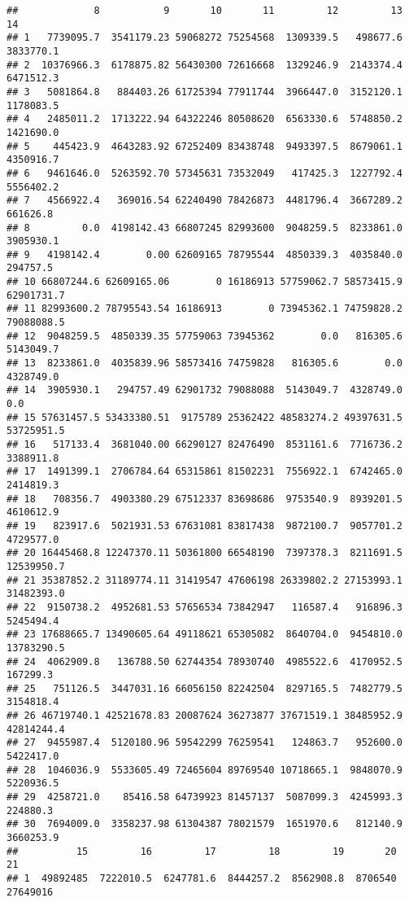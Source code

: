 \documentclass[
]{article}
\begin{document}
\begin{verbatim}
##             8           9       10       11         12         13         14
## 1   7739095.7  3541179.23 59068272 75254568  1309339.5   498677.6  3833770.1
## 2  10376966.3  6178875.82 56430300 72616668  1329246.9  2143374.4  6471512.3
## 3   5081864.8   884403.26 61725394 77911744  3966447.0  3152120.1  1178083.5
## 4   2485011.2  1713222.94 64322246 80508620  6563330.6  5748850.2  1421690.0
## 5    445423.9  4643283.92 67252409 83438748  9493397.5  8679061.1  4350916.7
## 6   9461646.0  5263592.70 57345631 73532049   417425.3  1227792.4  5556402.2
## 7   4566922.4   369016.54 62240490 78426873  4481796.4  3667289.2   661626.8
## 8         0.0  4198142.43 66807245 82993600  9048259.5  8233861.0  3905930.1
## 9   4198142.4        0.00 62609165 78795544  4850339.3  4035840.0   294757.5
## 10 66807244.6 62609165.06        0 16186913 57759062.7 58573415.9 62901731.7
## 11 82993600.2 78795543.54 16186913        0 73945362.1 74759828.2 79088088.5
## 12  9048259.5  4850339.35 57759063 73945362        0.0   816305.6  5143049.7
## 13  8233861.0  4035839.96 58573416 74759828   816305.6        0.0  4328749.0
## 14  3905930.1   294757.49 62901732 79088088  5143049.7  4328749.0        0.0
## 15 57631457.5 53433380.51  9175789 25362422 48583274.2 49397631.5 53725951.5
## 16   517133.4  3681040.00 66290127 82476490  8531161.6  7716736.2  3388911.8
## 17  1491399.1  2706784.64 65315861 81502231  7556922.1  6742465.0  2414819.3
## 18   708356.7  4903380.29 67512337 83698686  9753540.9  8939201.5  4610612.9
## 19   823917.6  5021931.53 67631081 83817438  9872100.7  9057701.2  4729577.0
## 20 16445468.8 12247370.11 50361800 66548190  7397378.3  8211691.5 12539950.7
## 21 35387852.2 31189774.11 31419547 47606198 26339802.2 27153993.1 31482393.0
## 22  9150738.2  4952681.53 57656534 73842947   116587.4   916896.3  5245494.4
## 23 17688665.7 13490605.64 49118621 65305082  8640704.0  9454810.0 13783290.5
## 24  4062909.8   136788.50 62744354 78930740  4985522.6  4170952.5   167299.3
## 25   751126.5  3447031.16 66056150 82242504  8297165.5  7482779.5  3154818.4
## 26 46719740.1 42521678.83 20087624 36273877 37671519.1 38485952.9 42814244.4
## 27  9455987.4  5120180.96 59542299 76259541   124863.7   952600.0  5422417.0
## 28  1046036.9  5533605.49 72465604 89769540 10718665.1  9848070.9  5220936.5
## 29  4258721.0    85416.58 64739923 81457137  5087099.3  4245993.3   224880.3
## 30  7694009.0  3358237.98 61304387 78021579  1651970.6   812140.9  3660253.9
##          15         16         17         18         19       20       21
## 1  49892485  7222010.5  6247781.6  8444257.2  8562908.8  8706540 27649016

\end{verbatim}
\end{document}
